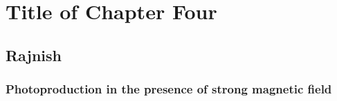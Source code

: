 
\chapter{Title of Chapter Four}

\label{Chapter4}


\section{Rajnish}

\subsection{Photoproduction in the presence of strong magnetic field}
\label{photoBneq0}

